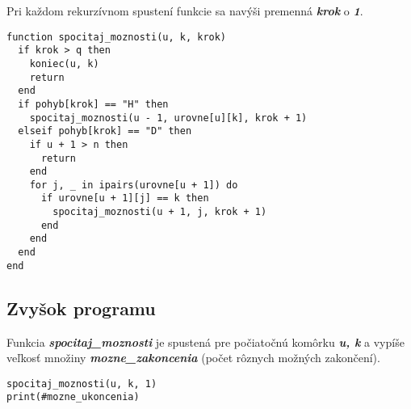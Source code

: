 \documentclass{article}
\begin{document}
Pri každom rekurzívnom spustení funkcie sa navýši premenná \textbf{\textit{krok}} o \textbf{\textit{1}}.

\begin{lstlisting}
function spocitaj_moznosti(u, k, krok)
  if krok > q then
    koniec(u, k)
    return
  end
  if pohyb[krok] == "H" then
    spocitaj_moznosti(u - 1, urovne[u][k], krok + 1)
  elseif pohyb[krok] == "D" then
    if u + 1 > n then
      return
    end
    for j, _ in ipairs(urovne[u + 1]) do
      if urovne[u + 1][j] == k then
        spocitaj_moznosti(u + 1, j, krok + 1)
      end
    end
  end
end

\end{lstlisting}

\subsection{Zvyšok programu}

Funkcia \textbf{\textit{spocitaj\_moznosti}} je spustená pre počiatočnú komôrku \textbf{\textit{u, k}} a vypíše veľkosť množiny \textbf{\textit{mozne\_zakoncenia}} (počet rôznych možných zakončení).

\begin{lstlisting}[language={[5.0]Lua}]
spocitaj_moznosti(u, k, 1)
print(#mozne_ukoncenia)
\end{lstlisting}
\end{document}
